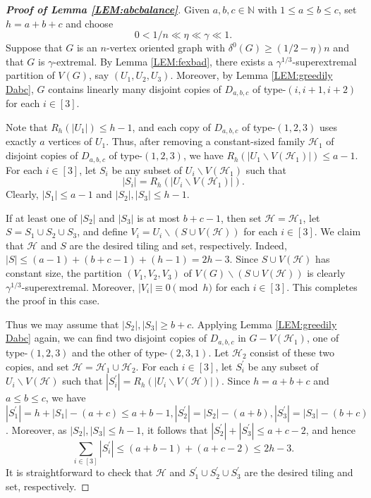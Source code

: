 \documentclass[11pt,a4paper,reqno]{amsart}
\theoremstyle{definition} %
\begin{document}
\begin{proof}[\textbf{Proof of Lemma \ref{LEM:abcbalance}}]
Given $a,b,c\in \mathbb{N}$ with $1\leqslant a\leqslant b\leqslant c$, set $h=a+b+c$ and choose
$$0<1/n \ll \eta \ll \gamma \ll 1.$$
Suppose that $G$ is an $n$-vertex oriented graph with $\delta^0(G)\geqslant (1/2-\eta)n$ and that $G$ is $\gamma$-extremal. By Lemma \ref{LEM:fexbad}, there exists a $\gamma^{1/3}$-superextremal partition of $V(G)$, say $(U_1,U_2,U_3)$. Moreover, by Lemma \ref{LEM:greedily Dabc}, $G$ contains linearly many disjoint copies of $D_{a,b,c}$ of type-$(i,i+1,i+2)$ for each $i\in[3]$.

Note that $R_h(|U_1|)\leqslant h-1$, and each copy of $D_{a,b,c}$ of type-$(1,2,3)$ uses exactly $a$ vertices of $U_1$. Thus, after removing a constant-sized family $\mathcal{H}_1$ of disjoint copies of $D_{a,b,c}$ of type-$(1,2,3)$, we have $R_h(|U_1\backslash V(\mathcal{H}_1)|)\leqslant a-1.$ 
For each $i\in[3]$, let $S_i$ be any subset of $U_i\backslash V(\mathcal{H}_1)$ such that
$$|S_i|=R_h(|U_i\backslash V(\mathcal{H}_1)|).$$
Clearly, $|S_1|\leqslant a-1$ and $|S_2|,|S_3|\leqslant h-1$.

If at least one of $|S_2|$ and $|S_3|$ is at most $b+c-1$, then set $\mathcal{H}=\mathcal{H}_1$, let $S=S_1\cup S_2\cup S_3$, and define $V_i=U_i\backslash (S\cup V(\mathcal{H}))$ 
for each $i\in[3]$. We claim that $\mathcal{H}$ and $S$ are the desired tiling and set, respectively. Indeed, $|S|\leqslant (a-1)+(b+c-1)+(h-1)=2h-3$. 
Since $S\cup V(\mathcal{H})$ has constant size, the partition $(V_1,V_2,V_3)$ of
$V(G)\backslash (S\cup V(\mathcal{H}))$ is clearly $\gamma^{1/3}$-superextremal. Moreover, $|V_i|\equiv 0\pmod h$ for each $i\in[3]$. This completes the proof in this case.

Thus we may assume that $|S_2|,|S_3|\geqslant b+c$. Applying Lemma \ref{LEM:greedily Dabc} again, we can find two disjoint copies of $D_{a,b,c}$ in $G-V(\mathcal{H}_1)$, one of type-$(1,2,3)$ and the other of type-$(2,3,1)$. Let $\mathcal{H}_2$ consist of these two copies, and set $\mathcal{H}=\mathcal{H}_1\cup \mathcal{H}_2$. For each $i\in[3]$, let $S_i^{\prime}$ be any subset of $U_i\backslash V(\mathcal{H})$ such that
$|S_i^{\prime}|=R_h(|U_i\backslash V(\mathcal{H})|)$. 
Since $h=a+b+c$ and $a\leqslant b\leqslant c$, we have $|S_1^{\prime}|=h+|S_1|-(a+c)\leqslant a+b-1,|S_2^{\prime}|=|S_2|-(a+b),|S_3^{\prime}|=|S_3|-(b+c)$. 
Moreover, as $|S_2|,|S_3|\leqslant h-1$, it follows that
$|S_2^{\prime}|+|S_3^{\prime}|\leqslant a+c-2$,
 and hence
$$\sum_{i\in[3]}|S_i^{\prime}|\leqslant (a+b-1)+(a+c-2)\leqslant 2h-3.$$
It is straightforward to check that $\mathcal{H}$ and $S_1^{\prime}\cup S_2^{\prime}\cup S_3^{\prime}$ are the desired tiling and set, respectively.



\end{proof}
\end{document}
